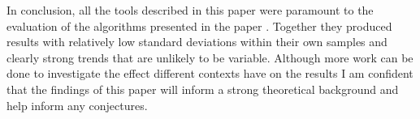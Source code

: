 In conclusion, all the tools described in this paper were paramount to the
evaluation of the algorithms presented in the paper \relalg{}. Together they
produced results with relatively low standard deviations within their own
samples and clearly strong trends that are unlikely to be variable. Although
more work can be done to investigate the effect different contexts have on the
results I am confident that the findings of this paper will inform a strong
theoretical background and help inform any conjectures.
